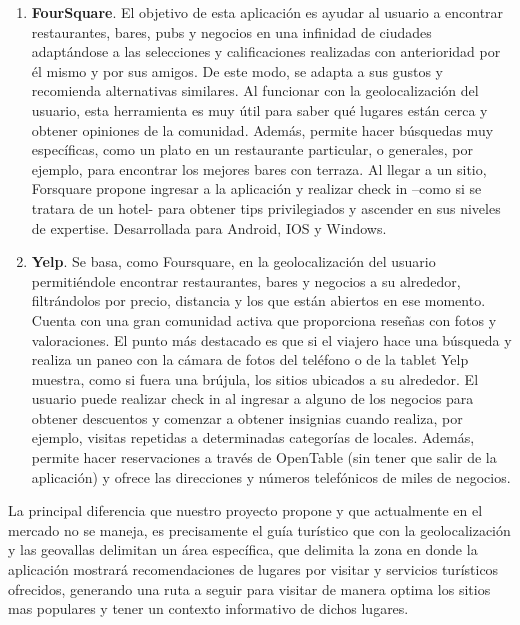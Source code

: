 \begin{enumerate}
	\item \textbf{FourSquare}. El objetivo de esta aplicación es ayudar al usuario a encontrar restaurantes, bares, pubs y negocios en una infinidad de ciudades adaptándose a las selecciones y calificaciones realizadas con anterioridad por él mismo y por sus amigos. De este modo, se adapta a sus gustos y recomienda alternativas similares. Al funcionar con la geolocalización del usuario, esta herramienta es muy útil para saber qué lugares están cerca y obtener opiniones de la comunidad. Además, permite hacer búsquedas muy específicas, como un plato en un restaurante particular, o generales, por ejemplo, para encontrar los mejores bares con terraza. Al llegar a un sitio, Forsquare propone ingresar a la aplicación y realizar check in –como si se tratara de un hotel- para obtener tips privilegiados y ascender en sus niveles de expertise. Desarrollada para Android, IOS y Windows.\cite{FourSquare}
	
	\item  \textbf{Yelp}. Se basa, como Foursquare, en la geolocalización del usuario permitiéndole encontrar restaurantes, bares y negocios a su alrededor, filtrándolos por precio, distancia y los que están abiertos en ese momento. Cuenta con una gran comunidad activa que proporciona reseñas con fotos y valoraciones. El punto más destacado es que si el viajero hace una búsqueda y realiza un paneo con la cámara de fotos del teléfono o de la tablet Yelp muestra, como si fuera una brújula, los sitios ubicados a su alrededor. El usuario puede realizar check in al ingresar a alguno de los negocios para obtener descuentos y comenzar a obtener insignias cuando realiza,  por ejemplo, visitas repetidas a determinadas categorías de locales. Además, permite hacer reservaciones a través de OpenTable (sin tener que salir de la aplicación) y ofrece las direcciones y números telefónicos de miles de negocios.\cite{FourSquare}
	
\end{enumerate}

La principal diferencia que nuestro proyecto propone y que actualmente en el mercado no se maneja, es precisamente el guía turístico que con la geolocalización y las geovallas delimitan un área específica, que delimita la zona en donde la aplicación mostrará recomendaciones de lugares por visitar y servicios turísticos ofrecidos, generando una ruta a seguir para visitar de manera optima los sitios mas populares y tener un contexto informativo de dichos lugares.\\

